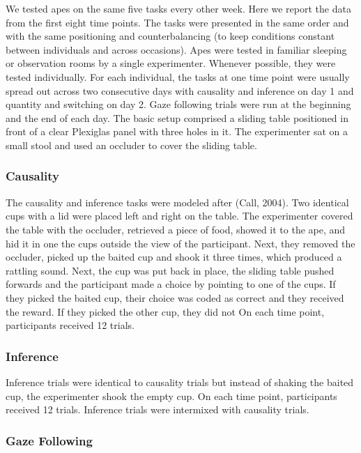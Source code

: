 \documentclass[10pt, letterpaper]{article}
\begin{document}
We tested apes on the same five tasks every other week. Here we report
the data from the first eight time points. The tasks were presented in
the same order and with the same positioning and counterbalancing (to
keep conditions constant between individuals and across occasions). Apes
were tested in familiar sleeping or observation rooms by a single
experimenter. Whenever possible, they were tested individually. For each
individual, the tasks at one time point were usually spread out across
two consecutive days with causality and inference on day 1 and quantity
and switching on day 2. Gaze following trials were run at the beginning
and the end of each day. The basic setup comprised a sliding table
positioned in front of a clear Plexiglas panel with three holes in it.
The experimenter sat on a small stool and used an occluder to cover the
sliding table.

\hypertarget{causality}{%
\subsubsection{Causality}\label{causality}}

The causality and inference tasks were modeled after (Call, 2004). Two
identical cups with a lid were placed left and right on the table. The
experimenter covered the table with the occluder, retrieved a piece of
food, showed it to the ape, and hid it in one the cups outside the view
of the participant. Next, they removed the occluder, picked up the
baited cup and shook it three times, which produced a rattling sound.
Next, the cup was put back in place, the sliding table pushed forwards
and the participant made a choice by pointing to one of the cups. If
they picked the baited cup, their choice was coded as correct and they
received the reward. If they picked the other cup, they did not On each
time point, participants received 12 trials.

\hypertarget{inference}{%
\subsubsection{Inference}\label{inference}}

Inference trials were identical to causality trials but instead of
shaking the baited cup, the experimenter shook the empty cup. On each
time point, participants received 12 trials. Inference trials were
intermixed with causality trials.

\hypertarget{gaze-following}{%
\subsubsection{Gaze Following}\label{gaze-following}}
\end{document}
